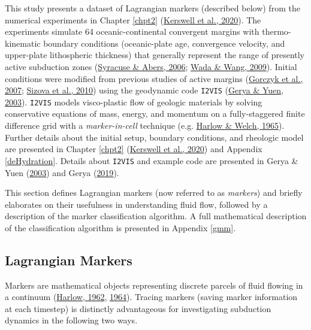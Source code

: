 This study presents a dataset of Lagrangian markers (described below) from the numerical experiments in Chapter \ref{chpt2} (\protect\hyperlink{ref-kerswell2020}{Kerswell et al., 2020}). The experiments simulate 64 oceanic-continental convergent margins with thermo-kinematic boundary conditions (oceanic-plate age, convergence velocity, and upper-plate lithospheric thickness) that generally represent the range of presently active subduction zones (\protect\hyperlink{ref-syracuse2006}{Syracuse \& Abers, 2006}; \protect\hyperlink{ref-wada2009}{Wada \& Wang, 2009}). Initial conditions were modified from previous studies of active margins (\protect\hyperlink{ref-gorczyk2007}{Gorczyk et al., 2007}; \protect\hyperlink{ref-sizova2010}{Sizova et al., 2010}) using the geodynamic code \texttt{I2VIS} (\protect\hyperlink{ref-gerya2003}{Gerya \& Yuen, 2003}). \texttt{I2VIS} models visco-plastic flow of geologic materials by solving conservative equations of mass, energy, and momentum on a fully-staggered finite difference grid with a \emph{marker-in-cell} technique (e.g. \protect\hyperlink{ref-harlow1965}{Harlow \& Welch, 1965}). Further details about the initial setup, boundary conditions, and rheologic model are presented in Chapter \ref{chpt2} (\protect\hyperlink{ref-kerswell2020}{Kerswell et al., 2020}) and Appendix \ref{deHydration}. Details about \texttt{I2VIS} and example code are presented in Gerya \& Yuen (\protect\hyperlink{ref-gerya2003}{2003}) and Gerya (\protect\hyperlink{ref-gerya2019}{2019}).

This section defines Lagrangian markers (now referred to as \emph{markers}) and briefly elaborates on their usefulness in understanding fluid flow, followed by a description of the marker classification algorithm. A full mathematical description of the classification algorithm is presented in Appendix \ref{gmm}.

\hypertarget{lagrangian-markers}{%
\subsection{Lagrangian Markers}\label{lagrangian-markers}}

Markers are mathematical objects representing discrete parcels of fluid flowing in a continuum (\protect\hyperlink{ref-harlow1962}{Harlow, 1962}, \protect\hyperlink{ref-harlow1964}{1964}). Tracing markers (saving marker information at each timestep) is distinctly advantageous for investigating subduction dynamics in the following two ways.

